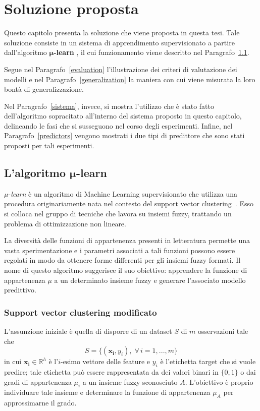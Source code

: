 \documentclass[12pt]{report}
\theoremstyle{definition}
\begin{document}
\chapter{Soluzione proposta}
\label{Capitolo 2}
\onehalfspacing
Questo capitolo presenta la soluzione che viene proposta in questa tesi.
Tale soluzione consiste in un sistema di apprendimento supervisionato a partire dall'algoritmo $\bm{\mu}$\textbf{-learn} \cite{1}, il cui funzionamento viene descritto nel Paragrafo~\ref{mulearn}.

Segue nel Paragrafo~\ref{evaluation} l'illustrazione dei criteri di valutazione dei modelli e nel Paragrafo~\ref{generalization} la maniera con cui viene misurata la loro bontà di generalizzazione.

Nel Paragrafo~\ref{sistema}, invece, si mostra l'utilizzo che è stato fatto dell'algoritmo sopracitato all'interno del sistema proposto in questo capitolo, delineando le fasi che si susseguono nel corso degli esperimenti. Infine, nel Paragrafo~\ref{predictors} vengono mostrati i due tipi di predittore che sono stati proposti per tali esperimenti.

\section[\texorpdfstring{L'algoritmo $\mu$-learn}%
                        {mu-learn}]%
        {L'algoritmo $\bm{\mu}$-learn}  %
\label{mulearn}
$\mu$-\textit{learn} è un algoritmo di Machine Learning supervisionato che utilizza una procedura originariamente nata nel contesto del support vector clustering~\cite{23}.
Esso si colloca nel gruppo di tecniche che lavora su insiemi fuzzy, trattando un problema di ottimizzazione non lineare.

La diversità delle funzioni di appartenenza presenti in letteratura permette una vasta sperimentazione e i parametri associati a tali funzioni possono essere regolati in modo da ottenere forme differenti per gli insiemi fuzzy formati.
Il nome di questo algoritmo suggerisce il suo obiettivo: apprendere la funzione di appartenenza $\mu$ a un determinato insieme fuzzy e generare l'associato modello predittivo.

\subsection{Support vector clustering modificato}\label{svcmodified}
L'assunzione iniziale è quella di disporre di un dataset $S$ di $m$ osservazioni tale che
\begin{equation}
    S = \{(\mathbf{x_i}, y_i), \; \forall\,i=1, ..., m\}
\end{equation}
in cui $\mathbf{x_i} \in \mathbb{R}^h$ è l'$i$-esimo vettore delle feature e $y_i$ è l'etichetta target che si vuole predire; tale etichetta può essere rappresentata da dei valori binari in $\{0,1\}$ o dai gradi di appartenenza $\mu_i$ a un insieme fuzzy sconosciuto $A$.
L'obiettivo è proprio individuare tale insieme e determinare la funzione di appartenenza $\mu_A$ per approssimarne il grado.
\end{document}
